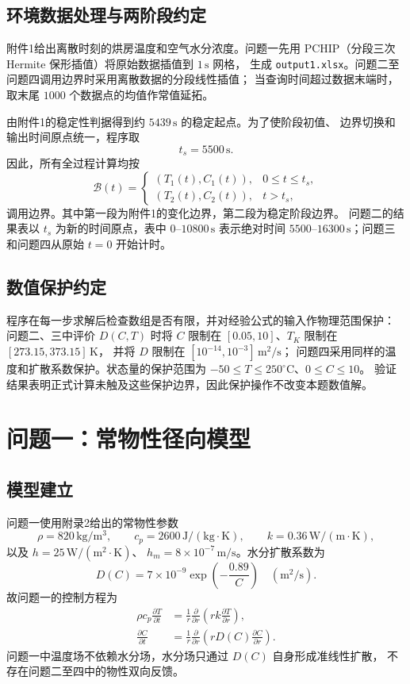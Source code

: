 \documentclass[UTF8,a4paper,11pt]{ctexart}
\numberwithin{equation}{section}
\begin{document}
\subsection{环境数据处理与两阶段约定}

附件1给出离散时刻的烘房温度和空气水分浓度。问题一先用
PCHIP（分段三次 Hermite 保形插值）将原始数据插值到 \(1\,\mathrm{s}\) 网格，
生成 \texttt{output1.xlsx}。问题二至问题四调用边界时采用离散数据的分段线性插值；
当查询时间超过数据末端时，取末尾 \(1000\) 个数据点的均值作常值延拓。

由附件1的稳定性判据得到约 \(5439\,\mathrm{s}\) 的稳定起点。为了使阶段初值、
边界切换和输出时间原点统一，程序取
\[
t_s=5500\,\mathrm{s}.
\]
因此，所有全过程计算均按
\[
\mathcal{B}(t)=
\begin{cases}
(T_1(t),C_1(t)),&0\le t\le t_s,\\
(T_2(t),C_2(t)),&t>t_s,
\end{cases}
\]
调用边界。其中第一段为附件1的变化边界，第二段为稳定阶段边界。
问题二的结果表以 \(t_s\) 为新的时间原点，表中 \(0\)--\(10800\,\mathrm{s}\)
表示绝对时间 \(5500\)--\(16300\,\mathrm{s}\)；问题三和问题四从原始
\(t=0\) 开始计时。

\subsection{数值保护约定}

程序在每一步求解后检查数组是否有限，并对经验公式的输入作物理范围保护：
问题二、三中评价 \(D(C,T)\) 时将 \(C\) 限制在
\([0.05,10]\)、\(T_K\) 限制在 \([273.15,373.15]\,\mathrm{K}\)，
并将 \(D\) 限制在 \([10^{-14},10^{-3}]\,\mathrm{m^2/s}\)；
问题四采用同样的温度和扩散系数保护。状态量的保护范围为
\(-50\le T\le250^\circ\mathrm{C}\)、\(0\le C\le10\)。
验证结果表明正式计算未触及这些保护边界，因此保护操作不改变本题数值解。

\section{问题一：常物性径向模型}

\subsection{模型建立}

问题一使用附录2给出的常物性参数
\[
\rho=820\,\mathrm{kg/m^3},\qquad
c_p=2600\,\mathrm{J/(kg\cdot K)},\qquad
k=0.36\,\mathrm{W/(m\cdot K)},
\]
以及 \(h=25\,\mathrm{W/(m^2\cdot K)}\)、
\(h_m=8\times10^{-7}\,\mathrm{m/s}\)。水分扩散系数为
\begin{equation}
D(C)=7\times10^{-9}\exp\left(-\frac{0.89}{C}\right)
\quad(\mathrm{m^2/s}). \label{eq:q1-D}
\end{equation}
故问题一的控制方程为
\begin{align}
\rho c_p\frac{\partial T}{\partial t}
&=\frac{1}{r}\frac{\partial}{\partial r}
\left(rk\frac{\partial T}{\partial r}\right), \label{eq:q1-T}\\
\frac{\partial C}{\partial t}
&=\frac{1}{r}\frac{\partial}{\partial r}
\left(rD(C)\frac{\partial C}{\partial r}\right). \label{eq:q1-C}
\end{align}
问题一中温度场不依赖水分场，水分场只通过 \(D(C)\) 自身形成准线性扩散，
不存在问题二至四中的物性双向反馈。
\end{document}
